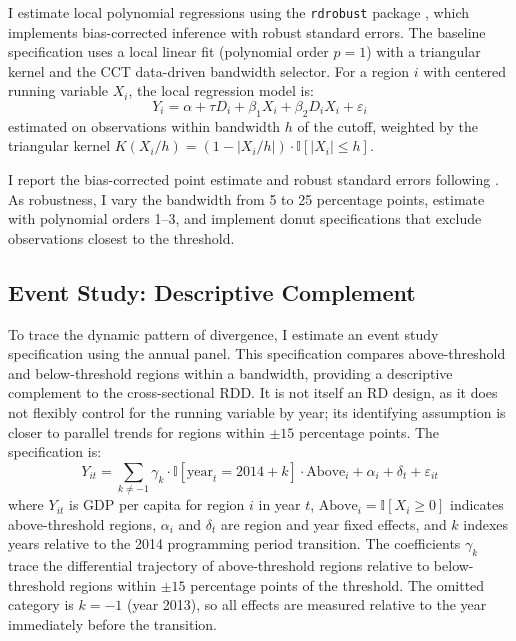 \documentclass[12pt]{article}
\newcommand{\ind}{\mathbb{I}}
\begin{document}
I estimate local polynomial regressions using the \texttt{rdrobust} package \citep{CalonicoCattaneoTitiunik2014, CalonicoCattaneoFarrell2020}, which implements bias-corrected inference with robust standard errors. The baseline specification uses a local linear fit (polynomial order $p = 1$) with a triangular kernel and the CCT data-driven bandwidth selector. For a region $i$ with centered running variable $X_i$, the local regression model is:
\begin{equation}
Y_i = \alpha + \tau D_i + \beta_1 X_i + \beta_2 D_i X_i + \varepsilon_i
\end{equation}
estimated on observations within bandwidth $h$ of the cutoff, weighted by the triangular kernel $K(X_i / h) = (1 - |X_i / h|) \cdot \ind[|X_i| \leq h]$.

I report the bias-corrected point estimate and robust standard errors following \citet{CalonicoCattaneoTitiunik2014}. As robustness, I vary the bandwidth from 5 to 25 percentage points, estimate with polynomial orders 1--3, and implement donut specifications that exclude observations closest to the threshold.

\subsection{Event Study: Descriptive Complement}

To trace the dynamic pattern of divergence, I estimate an event study specification using the annual panel. This specification compares above-threshold and below-threshold regions within a bandwidth, providing a descriptive complement to the cross-sectional RDD. It is not itself an RD design, as it does not flexibly control for the running variable by year; its identifying assumption is closer to parallel trends for regions within $\pm 15$ percentage points. The specification is:
\begin{equation}
Y_{it} = \sum_{k \neq -1} \gamma_k \cdot \ind[\text{year}_t = 2014 + k] \cdot \text{Above}_i + \alpha_i + \delta_t + \varepsilon_{it}
\label{eq:eventstudy}
\end{equation}
where $Y_{it}$ is GDP per capita for region $i$ in year $t$, $\text{Above}_i = \ind[X_i \geq 0]$ indicates above-threshold regions, $\alpha_i$ and $\delta_t$ are region and year fixed effects, and $k$ indexes years relative to the 2014 programming period transition. The coefficients $\gamma_k$ trace the differential trajectory of above-threshold regions relative to below-threshold regions within $\pm 15$ percentage points of the threshold. The omitted category is $k = -1$ (year 2013), so all effects are measured relative to the year immediately before the transition.
\end{document}
